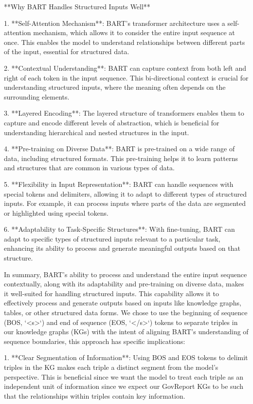 \documentclass[12pt]{article}
\begin{document}
**Why BART Handles Structured Inputs Well**

1. **Self-Attention Mechanism**: BART's transformer architecture uses a self-attention mechanism, which allows it to consider the entire input sequence at once. This enables the model to understand relationships between different parts of the input, essential for structured data.

2. **Contextual Understanding**: BART can capture context from both left and right of each token in the input sequence. This bi-directional context is crucial for understanding structured inputs, where the meaning often depends on the surrounding elements.

3. **Layered Encoding**: The layered structure of transformers enables them to capture and encode different levels of abstraction, which is beneficial for understanding hierarchical and nested structures in the input.

4. **Pre-training on Diverse Data**: BART is pre-trained on a wide range of data, including structured formats. This pre-training helps it to learn patterns and structures that are common in various types of data.

5. **Flexibility in Input Representation**: BART can handle sequences with special tokens and delimiters, allowing it to adapt to different types of structured inputs. For example, it can process inputs where parts of the data are segmented or highlighted using special tokens.

6. **Adaptability to Task-Specific Structures**: With fine-tuning, BART can adapt to specific types of structured inputs relevant to a particular task, enhancing its ability to process and generate meaningful outputs based on that structure.

In summary, BART's ability to process and understand the entire input sequence contextually, along with its adaptability and pre-training on diverse data, makes it well-suited for handling structured inputs. This capability allows it to effectively process and generate outputs based on inputs like knowledge graphs, tables, or other structured data forms.
We chose to use the beginning of sequence (BOS, `<s>`) and end of sequence (EOS, `</s>`) tokens to separate triples in our knowledge graphs (KGs) with the intent of aligning BART's understanding of sequence boundaries, this approach has specific implications:

1. **Clear Segmentation of Information**: Using BOS and EOS tokens to delimit triples in the KG makes each triple a distinct segment from the model's perspective. This is beneficial since we want the model to treat each triple as an independent unit of information since we expect our GovReport KGs to be such that the relationships within triples contain key information.
\end{document}
